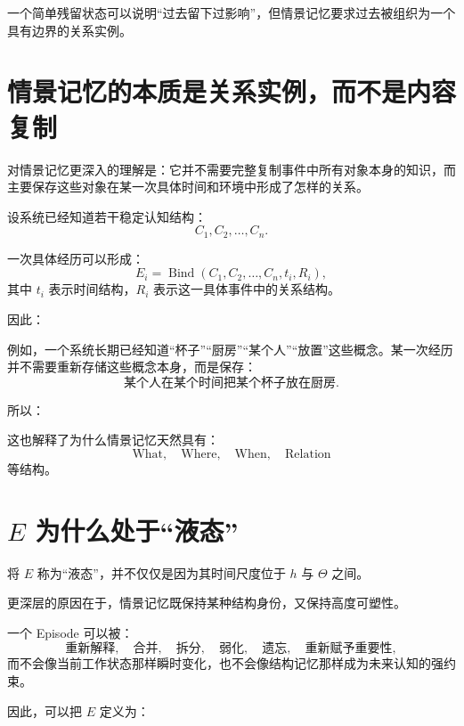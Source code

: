 一个简单残留状态可以说明“过去留下过影响”，但情景记忆要求过去被组织为一个具有边界的关系实例。

\section{情景记忆的本质是关系实例，而不是内容复制}

对情景记忆更深入的理解是：它并不需要完整复制事件中所有对象本身的知识，而主要保存这些对象在某一次具体时间和环境中形成了怎样的关系。

设系统已经知道若干稳定认知结构：
\[
C_1,C_2,\ldots,C_n.
\]

一次具体经历可以形成：
\[
E_i=
\operatorname{Bind}
(
C_1,C_2,\ldots,C_n,
t_i,
R_i
),
\]
其中 $t_i$ 表示时间结构，$R_i$ 表示这一具体事件中的关系结构。

因此：
\begin{statementbox}
\centering
{}
\end{statementbox}

例如，一个系统长期已经知道“杯子”“厨房”“某个人”“放置”这些概念。某一次经历并不需要重新存储这些概念本身，而是保存：
\[
\text{某个人在某个时间把某个杯子放在厨房}.
\]

所以：
\begin{statementbox}
\centering
{}
\end{statementbox}

这也解释了为什么情景记忆天然具有：
\[
\text{What},
\quad
\text{Where},
\quad
\text{When},
\quad
\text{Relation}
\]
等结构。

\section{$E$ 为什么处于“液态”}

将 $E$ 称为“液态”，并不仅仅是因为其时间尺度位于 $h$ 与 $\Theta$ 之间。

更深层的原因在于，情景记忆既保持某种结构身份，又保持高度可塑性。

一个 Episode 可以被：
\[
\text{重新解释},
\quad
\text{合并},
\quad
\text{拆分},
\quad
\text{弱化},
\quad
\text{遗忘},
\quad
\text{重新赋予重要性},
\]
而不会像当前工作状态那样瞬时变化，也不会像结构记忆那样成为未来认知的强约束。

因此，可以把 $E$ 定义为：
\begin{statementbox}
\centering
{}
\end{statementbox}

